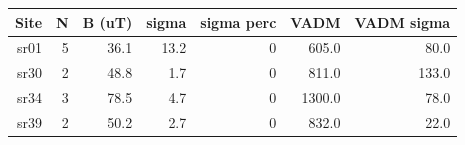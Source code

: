 \documentclass{article}
\begin{document}
\begin{longtable}{rrrrrrr}
\hline
Site & N & B (uT) & sigma & sigma perc & VADM & VADM sigma\\
\hline
sr01 & 5 &    36.1 &    13.2 & 0 &   605.0 &    80.0\\
sr30 & 2 &    48.8 &     1.7 & 0 &   811.0 &   133.0\\
sr34 & 3 &    78.5 &     4.7 & 0 &  1300.0 &    78.0\\
sr39 & 2 &    50.2 &     2.7 & 0 &   832.0 &    22.0\\
\hline
\end{longtable}
\end{document}

